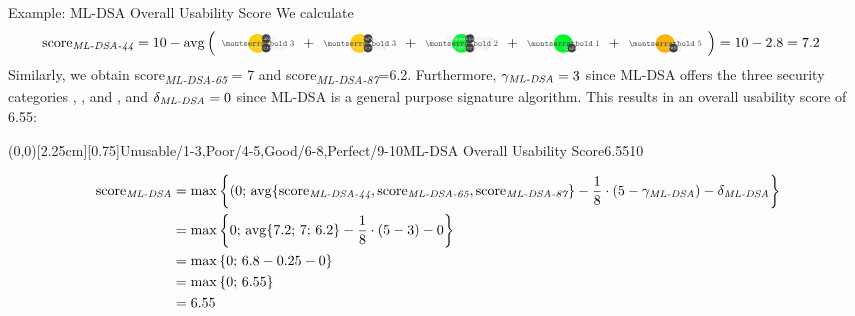 \documentclass[11pt,english,a4paper, landscape]{scrartcl}
\begin{document}
   	\begin{algorithmbox}{Example: ML-DSA Overall Usability Score}
		\scriptsize
		We calculate
		\begin{align*}
			\textnormal{score\textsubscript{\itshape ML-DSA-44}} &= 10 - \avg\left({\scriptsize
			\tripleicon{\montserratbold 3}{\faMicrochip}{themeyellow}{0.6}{\faKey} + %
			\tripleicon{\montserratbold 3}{\faMicrochip}{themeyellow}{0.6}{\faPen} + %
			\tripleicon{\montserratbold 2}{\faMicrochip}{themegreen}{0.6}{\faQuestionCircle} + %
			\doubleicon{\montserratbold 1}{\faPen}{themegreen}{0.6}+ %
			\doubleicon{\montserratbold 5}{\faKey}{themeorange}{0.6}
			}\right) = 10 - 2.8 = 7.2
		\end{align*}
		Similarly, we obtain \textnormal{score\textsubscript{\itshape ML-DSA-65}} = 7 and \textnormal{score\textsubscript{\itshape ML-DSA-87}}=6.2. Furthermore, $\gamma_\textnormal{\itshape ML-DSA} = 3$ since ML-DSA offers the three security categories \hspace{-1mm}, \hspace{-1mm}, and \hspace{-1mm}, and $\delta_\textnormal{\itshape ML-DSA} = 0$ since ML-DSA is a general purpose signature algorithm. This results in an overall usability score of 6.55:\\[\baselineskip]

		\begin{minipage}[T]{0.25\textwidth}
			\GreenAbsoluteSpeedometer(0,0)[2.25cm][0.75]{Unusable/1-3,Poor/4-5,Good/6-8,Perfect/9-10}{ML-DSA Overall Usability Score}{6.55}{10}{\tiny}{\tiny \montserratsemibold}
		\end{minipage}
		\hfill
		\begin{minipage}[T]{0.75\textwidth}
		\vspace{-\baselineskip}
			\begin{align*}
				\textnormal{score\textsubscript{\itshape ML-DSA}} &= \max\left\{(0;\,\operatorname{avg}\{\textnormal{score}_\textnormal{\itshape ML-DSA-44},\textnormal{score}_\textnormal{\itshape ML-DSA-65},\textnormal{score}_\textnormal{\itshape ML-DSA-87}\} - \frac{1}{8}\cdot\left(5-\gamma_\textnormal{\itshape ML-DSA}\right) - \delta_\textnormal{\itshape ML-DSA}\right\}\\
				&=\max\left\{0;\,\operatorname{avg}\{7.2;\,7;\,6.2\} - \frac{1}{8}\cdot\left(5-3\right) - 0\right\}\\
				&=\max\left\{0;\,6.8 - 0.25 - 0\right\}\\
				&=\max\left\{0;\,6.55\right\}\\
				&=6.55
			\end{align*}
		\end{minipage}

	\end{algorithmbox}
\end{document}
